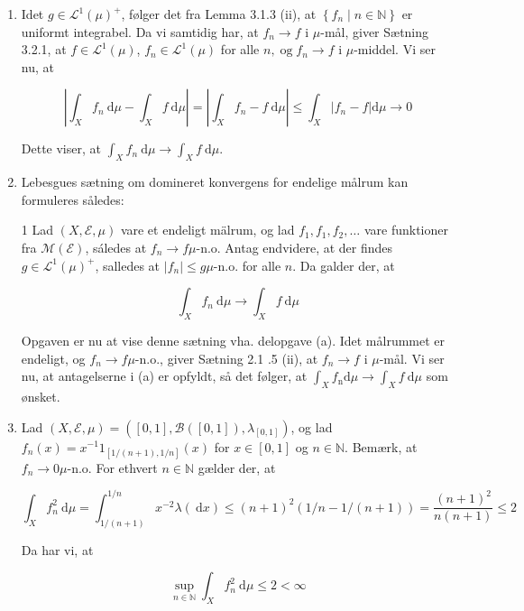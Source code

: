 \documentclass{Class}
\begin{document}
\begin{enumerate}
    \item Idet $g \in \mathcal{L}^1(\mu)^{+}$, følger det fra Lemma 3.1.3 (ii), at $\left\{f_n \mid n \in \mathbb{N}\right\}$ er uniformt integrabel. Da vi samtidig har, at $f_n \rightarrow f$ i $\mu$-mål, giver Sætning 3.2.1, at $f \in \mathcal{L}^1(\mu)$, $f_n \in \mathcal{L}^1(\mu)$ for alle $n, \operatorname{og} f_n \rightarrow f$ i $\mu$-middel. Vi ser nu, at

    $$
    \left|\int_X f_n \mathrm{~d} \mu-\int_X f \mathrm{~d} \mu\right|=\left|\int_X f_n-f \mathrm{~d} \mu\right| \leq \int_X\left|f_n-f\right| \mathrm{d} \mu \rightarrow 0
    $$
    
    
    Dette viser, at $\int_X f_n \mathrm{~d} \mu \rightarrow \int_X f \mathrm{~d} \mu$.
    \item Lebesgues sætning om domineret konvergens for endelige målrum kan formuleres således:

    \begin{theorem-manual}{1}
        Lad $(X, \mathcal{E}, \mu)$ vare et endeligt mälrum, og lad $f_1, f_1, f_2, \ldots$ vare funktioner fra $\mathcal{M}(\mathcal{E})$, sáledes at $f_n \rightarrow f \mu$-n.o. Antag endvidere, at der findes $g \in \mathcal{L}^1(\mu)^{+}$, salledes at $\left|f_n\right| \leq g \mu$-n.o. for alle $n$. Da galder der, at
    
    $$
    \int_X f_n \mathrm{~d} \mu \rightarrow \int_X f \mathrm{~d} \mu
    $$
    \end{theorem-manual}
    
    
    Opgaven er nu at vise denne sætning vha. delopgave (a). Idet målrummet er endeligt, og $f_n \rightarrow f \mu$-n.o., giver Sætning 2.1 .5 (ii), at $f_n \rightarrow f$ i $\mu$-mål. Vi ser nu, at antagelserne i (a) er opfyldt, så det følger, at $\int_X f_{\mathrm{n}} \mathrm{d} \mu \rightarrow \int_X f \mathrm{~d} \mu$ som ønsket.
    \item Lad $(X, \mathcal{E}, \mu)=\left([0,1], \mathcal{B}([0,1]), \lambda_{[0,1]}\right)$, og lad $f_n(x)=x^{-1} 1_{[1 /(n+1), 1 / n]}(x)$ for $x \in[0,1]$ og $n \in \mathbb{N}$. Bemærk, at $f_n \rightarrow 0 \mu$-n.o. For ethvert $n \in \mathbb{N}$ gælder der, at

    $$
    \int_X f_n^2 \mathrm{~d} \mu=\int_{1 /(n+1)}^{1 / n} x^{-2} \lambda(\mathrm{~d} x) \leq(n+1)^2(1 / n-1 /(n+1))=\frac{(n+1)^2}{n(n+1)} \leq 2
    $$
    
    
    Da har vi, at
    
    $$
    \sup _{n \in \mathbb{N}} \int_X f_n^2 \mathrm{~d} \mu \leq 2<\infty
    $$
    

\end{enumerate}
\end{document}
